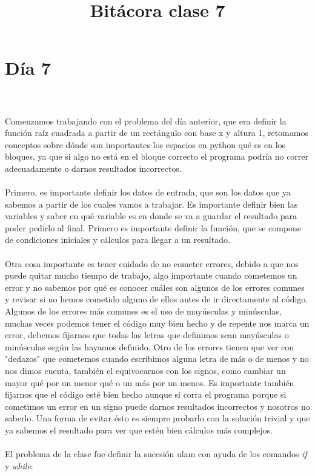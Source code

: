 \documentclass{book}
\begin{document}
	\section{Día 7}
	\title{\Huge Bitácora clase 7} \\
	\\
	Comenzamos trabajando con el problema del día anterior, que era definir la función raíz cuadrada a partir de un rectángulo con base x y altura 1, retomamos conceptos sobre dónde son importantes los espacios en python qué es en los bloques, ya que si algo no está en el bloque correcto el programa podría no correr adecuadamente o darnos resultados incorrectos.\\
	\\
	Primero, es importante definir los datos de entrada, que son los datos que ya sabemos a partir de los cuales vamos a trabajar. Es importante definir bien las variables y saber en qué variable es en donde se va a guardar el resultado para poder pedirlo al final. Primero es importante definir la función, que se compone de condiciones iniciales y cálculos para llegar a un resultado.\\
	\\
	Otra cosa importante es tener cuidado de no cometer errores, debido a que nos puede quitar mucho tiempo de trabajo, algo importante cuando cometemos un error y no sabemos por qué es conocer cuáles son algunos de los errores comunes y revisar si no hemos cometido alguno de ellos antes de ir directamente al código. Algunos de los errores más comunes es el uso de mayúsculas y minúsculas, muchas veces podemos tener el código muy bien hecho y de repente nos marca un error, debemos fijarnos que todas las letras que definimos sean mayúsculas o minúsculas según las hayamos definido. Otro de los errores tienen que ver con "dedazos" que cometemos cuando escribimos alguna letra de más o de menos y no nos dimos cuenta, también el equivocarnos con los signos, como cambiar un mayor qué por un menor qué o un más por un menos. Es importante también fijarnos que el código esté bien hecho aunque si corra el programa porque si cometimos un error en un signo puede darnos resultados incorrectos y nosotros no saberlo. Una forma de evitar ésto es siempre probarlo con la solución trivial y que ya sabemos el resultado para ver que estén bien cálculos más complejos.\\
	\\
	El problema de la clase fue definir la sucesión ulam con ayuda de los comandos \textit{if} y \textit{while}:\\
\end{document}
